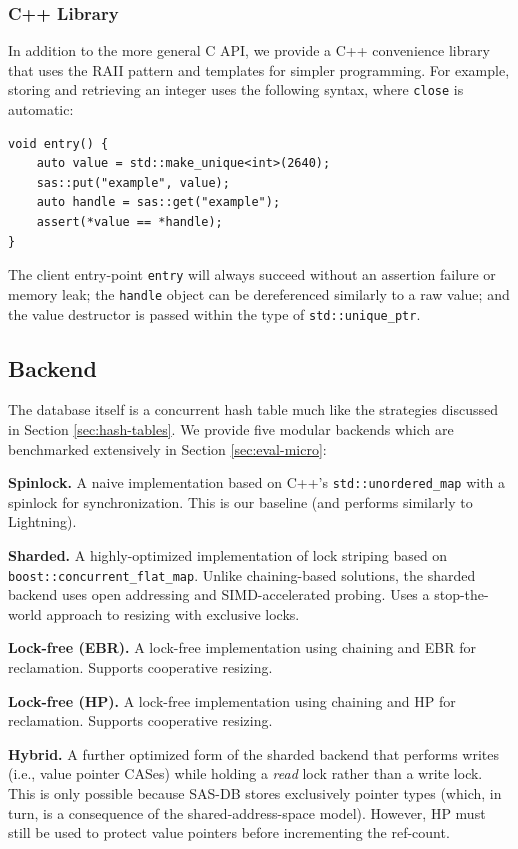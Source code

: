 \subsubsection{C++ Library}
In addition to the more general C API, we provide a C++ convenience library that
uses the RAII pattern and templates for simpler programming. For example,
storing and retrieving an integer uses the following syntax, where \texttt{close}
is automatic:
\begin{verbatim}
void entry() {
    auto value = std::make_unique<int>(2640);
    sas::put("example", value);
    auto handle = sas::get("example");
    assert(*value == *handle);
}
\end{verbatim}

The client entry-point \texttt{entry} will always succeed without an assertion
failure or memory leak; the \texttt{handle} object can be dereferenced similarly
to a raw value; and the value destructor is passed within the type of
\texttt{std::unique\_ptr}.

\subsection{Backend}
The database itself is a concurrent hash table much like the strategies
discussed in Section \ref{sec:hash-tables}. We provide five modular backends
which are benchmarked extensively in Section \ref{sec:eval-micro}:

\textbf{Spinlock.} A naive implementation based on C++'s
\texttt{std::unordered\_map} with a spinlock for synchronization. This is our
baseline (and performs similarly to Lightning).

\textbf{Sharded.} A highly-optimized implementation of lock striping based on
\texttt{boost::concurrent\_flat\_map}. Unlike chaining-based solutions, the
sharded backend uses open addressing and SIMD-accelerated probing. Uses a
stop-the-world approach to resizing with exclusive locks.

\textbf{Lock-free (EBR).} A lock-free implementation using chaining and EBR for
reclamation. Supports cooperative resizing.

\textbf{Lock-free (HP).} A lock-free implementation using chaining and HP for
reclamation. Supports cooperative resizing.

\textbf{Hybrid.} A further optimized form of the sharded backend that performs
writes (i.e., value pointer CASes) while holding a \emph{read} lock rather than
a write lock. This is only possible because SAS-DB stores exclusively pointer
types (which, in turn, is a consequence of the shared-address-space model).
However, HP must still be used to protect value pointers before incrementing the
ref-count.

